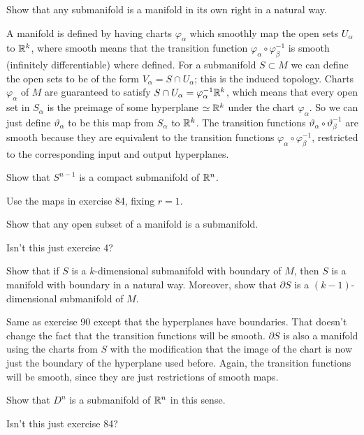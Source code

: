 \begin{p}%
{Show that any submanifold is a manifold in its own right in a natural way.}
\end{p}
{A manifold is defined by having charts $\varphi_\alpha$ which smoothly map the open sets $U_\alpha$ to $\mathbb{R}^k$, where smooth means that the transition function $\varphi_\alpha\circ\varphi_\beta^{-1}$ is smooth 
(infinitely differentiable) where defined. For a submanifold $S\subset M$ we can define the open sets to 
be of the form $V_\alpha=S\cap U_\alpha$; this is the induced topology. Charts $\varphi_\alpha$ of $M$ are
guaranteed to satisfy $S\cap U_\alpha=\varphi_\alpha^{-1}\mathbb{R}^k$, which means that every open set in $S_\alpha$ is the preimage of some hyperplane $\simeq\mathbb{R}^k$ under the chart $\varphi_\alpha$. So we can
just define $\vartheta_\alpha$ to be this map from $S_\alpha$ to $\mathbb{R}^k$. The transition functions
$\vartheta_\alpha\circ\vartheta_\beta^{-1}$ are smooth because they are equivalent to the transition
functions $\varphi_\alpha\circ\varphi_\beta^{-1}$, restricted to the corresponding input and output 
hyperplanes.}

\begin{p}%
{Show that $S^{n{-}1}$ is a compact submanifold of $\mathbb{R}^n$.}
\end{p}
{Use the maps in exercise 84, fixing $r=1$.}


\begin{p}%
{Show that any open subset of a manifold is a submanifold.}
\end{p}
{Isn't this just exercise 4?}

\begin{p}%
{Show that if $S$ is a $k$-dimensional submanifold 
with boundary of $M$, then $S$ is a manifold with boundary in a natural way. 
Moreover, show that $\partial S$ is a $(k{-}1)$-dimensional 
submanifold of $M$.}
\end{p}
{Same as exercise 90 except that the hyperplanes have boundaries.
That doesn't change the fact that the transition functions will be smooth. $\partial S$
is also a manifold using the charts from $S$ with the modification that the image of
the chart is now just the boundary of the hyperplane used before. Again, the transition
functions will be smooth, since they are just restrictions of smooth maps. }

\begin{p}%
{Show that $D^n$ is a submanifold of $\mathbb{R}^n$ in this sense.}
\end{p}
{Isn't this just 
exercise 84?}

